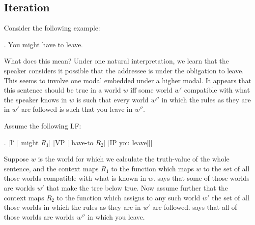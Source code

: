 \subsection{Iteration}

Consider the following example: 

\ex. You might have to leave.

What does this mean? Under one natural interpretation, we learn that the speaker considers it possible that the addressee is under the obligation to leave. This seems to involve one modal embedded under a higher modal. It appears that this sentence should be true in a world $w$ iff some world $w'$ compatible with what the speaker knows in $w$ is such that every world $w''$ in which the rules as they are in $w'$ are followed is such that you leave in $w''$.

Assume the following LF:

\exi. [I$'$ [ might $R_1$] [VP [ have-to $R_2$] [IP you leave]]]

Suppose $w$ is the world for which we calculate the truth-value of the whole sentence, and the context maps $R_1$ to the function which maps $w$ to the set of all those worlds compatible with what is known in $w$.  says that some of those worlds are worlds $w'$ that make the tree below  true. Now assume further that the context maps $R_2$ to the function which assigns to any such world $w'$ the set of all those worlds in which the rules as they are in $w'$ are followed.  says that all of those worlds are worlds $w''$ in which you leave.

